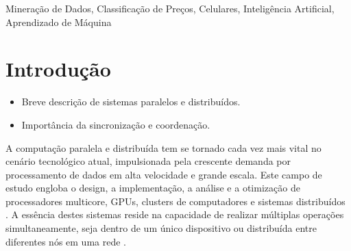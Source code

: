 \documentclass[conference]{IEEEtran}
\begin{document}
\begin{IEEEkeywords}
Mineração de Dados, Classificação de Preços, Celulares, Inteligência Artificial, Aprendizado de Máquina
\end{IEEEkeywords}















\section{Introdução}
\begin{itemize}
    \item Breve descrição de sistemas paralelos e distribuídos.
    \item Importância da sincronização e coordenação.
\end{itemize}

A computação paralela e distribuída tem se tornado cada vez mais vital 
no cenário tecnológico atual, impulsionada pela crescente demanda 
por processamento de dados em alta velocidade e grande escala. 
Este campo de estudo engloba o design, a implementação, 
a análise e a otimização de processadores multicore, GPUs, 
clusters de computadores 
e sistemas distribuídos \cite{coulouris2011distributed}. 
A essência destes sistemas reside na capacidade de realizar múltiplas 
operações simultaneamente, seja dentro de um único dispositivo ou 
distribuída entre diferentes nós em uma rede \cite{tanenbaum2007distributed}.
\end{document}
